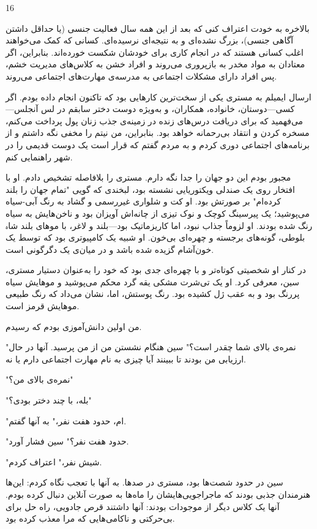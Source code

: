 16

بالاخره به خودت اعتراف کنی که بعد از این همه سال فعالیت جنسی (یا حداقل داشتن آگاهی جنسی)، بزرگ نشده‌ای و به نتیجه‌ای نرسیده‌ای. کسانی که کمک می‌خواهند اغلب کسانی هستند که در انجام کاری برای خودشان شکست خورده‌اند. بنابراین، اگر معتادان به مواد مخدر به بازپروری می‌روند و افراد خشن به کلاس‌های مدیریت خشم، پس افراد دارای مشکلات اجتماعی به مدرسه‌ی مهارت‌های اجتماعی می‌روند.

ارسال ایمیلم به مستری یکی از سخت‌ترین کارهایی بود که تاکنون انجام داده بودم. اگر کسی—دوستان، خانواده، همکاران، و به‌ویژه دوست دختر سابقم در لس آنجلس—می‌فهمید که برای دریافت درس‌های زنده در زمینه‌ی جذب زنان پول پرداخت می‌کنم، مسخره کردن و انتقاد بی‌رحمانه خواهد بود. بنابراین، من نیتم را مخفی نگه داشتم و از برنامه‌های اجتماعی دوری کردم و به مردم گفتم که قرار است یک دوست قدیمی را در شهر راهنمایی کنم.

مجبور بودم این دو جهان را جدا نگه دارم. مستری را بلافاصله تشخیص دادم. او با افتخار روی یک صندلی ویکتوریایی نشسته بود، لبخندی که گویی "تمام جهان را بلند کرده‌ام" بر صورتش بود. او کت و شلواری غیررسمی و گشاد به رنگ آبی-سیاه می‌پوشید؛ یک پیرسینگ کوچک و نوک تیزی از چانه‌اش آویزان بود و ناخن‌هایش به سیاه رنگ شده بودند. او لزوماً جذاب نبود، اما کاریزماتیک بود—بلند و لاغر، با موهای بلند شاہ بلوطی، گونه‌های برجسته و چهره‌ای بی‌خون. او شبیه یک کامپیوتری بود که توسط یک خون‌آشام گزیده شده باشد و در میان‌ی یک دگرگونی است.

در کنار او شخصیتی کوتاه‌تر و با چهره‌ای جدی بود که خود را به‌عنوان دستیار مستری، سین، معرفی کرد. او یک تی‌شرت مشکی یقه گرد محکم می‌پوشید و موهایش سیاه پررنگ بود و به عقب ژل کشیده بود. رنگ پوستش، اما، نشان می‌داد که رنگ طبیعی موهایش قرمز است.

من اولین دانش‌آموزی بودم که رسیدم.

"نمره‌ی بالای شما چقدر است؟" سین هنگام نشستن من از من پرسید. آنها در حال ارزیابی من بودند تا ببینند آیا چیزی به نام مهارت اجتماعی دارم یا نه.

"نمره‌ی بالای من؟"

"بله، با چند دختر بودی؟"

"ام، حدود هفت نفر،" به آنها گفتم.

"حدود هفت نفر؟" سین فشار آورد.

"شیش نفر،" اعتراف کردم.

سین در حدود شصت‌ها بود، مستری در صدها. به آنها با تعجب نگاه کردم: این‌ها هنرمندان جذبی بودند که ماجراجویی‌هایشان را ماه‌ها به صورت آنلاین دنبال کرده بودم. آنها یک کلاس دیگر از موجودات بودند: آنها داشتند قرص جادویی، راه حل برای بی‌حرکتی و ناکامی‌هایی که مرا معذب کرده بود.